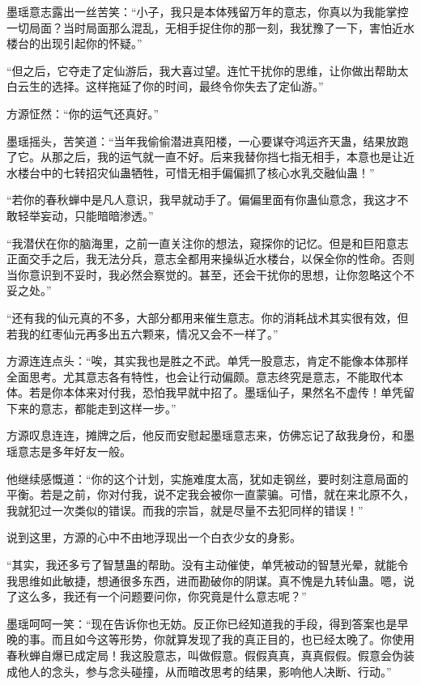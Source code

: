 \begin{this_body}
墨瑶意志露出一丝苦笑：“小子，我只是本体残留万年的意志，你真以为我能掌控一切局面？当时局面那么混乱，无相手捉住你的那一刻，我犹豫了一下，害怕近水楼台的出现引起你的怀疑。”

“但之后，它夺走了定仙游后，我大喜过望。连忙干扰你的思维，让你做出帮助太白云生的选择。这样拖延了你的时间，最终令你失去了定仙游。”

方源怔然：“你的运气还真好。”

墨瑶摇头，苦笑道：“当年我偷偷潜进真阳楼，一心要谋夺鸿运齐天蛊，结果放跑了它。从那之后，我的运气就一直不好。后来我替你挡七指无相手，本意也是让近水楼台中的七转招灾仙蛊牺牲，可惜无相手偏偏抓了核心水乳交融仙蛊！”

“若你的春秋蝉中是凡人意识，我早就动手了。偏偏里面有你蛊仙意念，我这才不敢轻举妄动，只能暗暗渗透。”

“我潜伏在你的脑海里，之前一直关注你的想法，窥探你的记忆。但是和巨阳意志正面交手之后，我无法分兵，意志全都用来操纵近水楼台，以保全你的性命。否则当你意识到不妥时，我必然会察觉的。甚至，还会干扰你的思想，让你忽略这个不妥之处。”

“还有我的仙元真的不多，大部分都用来催生意志。你的消耗战术其实很有效，但若我的红枣仙元再多出五六颗来，情况又会不一样了。”

方源连连点头：“唉，其实我也是胜之不武。单凭一股意志，肯定不能像本体那样全面思考。尤其意志各有特性，也会让行动偏颇。意志终究是意志，不能取代本体。若是你本体来对付我，恐怕我早就中招了。墨瑶仙子，果然名不虚传！单凭留下来的意志，都能走到这样一步。”

方源叹息连连，摊牌之后，他反而安慰起墨瑶意志来，仿佛忘记了敌我身份，和墨瑶意志是多年好友一般。

他继续感慨道：“你的这个计划，实施难度太高，犹如走钢丝，要时刻注意局面的平衡。若是之前，你对付我，说不定我会被你一直蒙骗。可惜，就在来北原不久，我就犯过一次类似的错误。而我的宗旨，就是尽量不去犯同样的错误！”

说到这里，方源的心中不由地浮现出一个白衣少女的身影。

“其实，我还多亏了智慧蛊的帮助。没有主动催使，单凭被动的智慧光晕，就能令我思维如此敏捷，想通很多东西，进而勘破你的阴谋。真不愧是九转仙蛊。嗯，说了这么多，我还有一个问题要问你，你究竟是什么意志呢？”

墨瑶呵呵一笑：“现在告诉你也无妨。反正你已经知道我的手段，得到答案也是早晚的事。而且如今这等形势，你就算发现了我的真正目的，也已经太晚了。你使用春秋蝉自爆已成定局！我这股意志，叫做假意。假假真真，真真假假。假意会伪装成他人的念头，参与念头碰撞，从而暗改思考的结果，影响他人决断、行动。”


\end{this_body}
